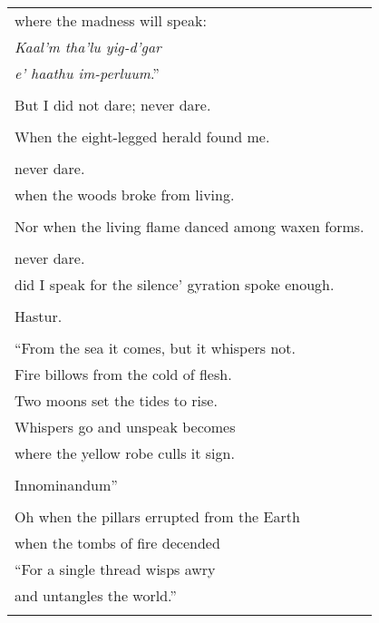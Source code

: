 \documentclass{article}
\begin{document}
\begin{center}
\begin{tabular}{l}
where the madness will speak: \\
\textit{Kaal'm tha'lu yig-d'gar} \\ %
\textit{e' haathu im-perluum}.'' \\ %
\\
But I did not dare; never dare. \\
\\
When the eight-legged herald found me. \\
\\
never dare. \\
when the woods broke from living. \\
\\
Nor when the living flame danced among waxen forms. \\
\\
never dare. \\
did I speak for the silence' gyration spoke enough. \\
\\
Hastur. \\ %
\\
``From the sea it comes, but it whispers not. \\
Fire billows from the cold of flesh. \\
Two moons set the tides to rise. \\
Whispers go and unspeak becomes \\
where the yellow robe culls it sign. \\
\\
Innominandum'' \\ %
\\
Oh when the pillars errupted from the Earth \\
when the tombs of fire decended \\

``For a single thread wisps awry \\
and untangles the world.'' \\
\\
\end{tabular}
\end{center}
\end{document}
